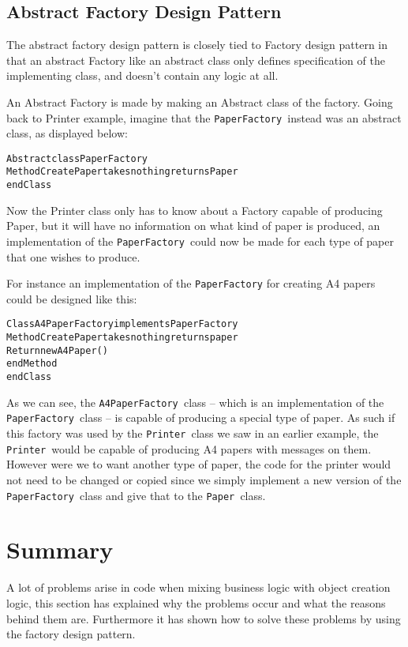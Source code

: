 \subsection{Abstract Factory Design Pattern}

The abstract factory design pattern is closely tied to Factory design
pattern in that an abstract Factory like an abstract class only defines
specification of the implementing class, and doesn\textquoteright{}t
contain any logic at all. 

An Abstract Factory is made by making an Abstract class of the factory.
Going back to Printer example, imagine that the \texttt{PaperFactory
}instead was an abstract class, as displayed below:

\begin{alltt}
Abstract class PaperFactory 	
    Method CreatePaper takes nothing returns Paper 
endClass
\end{alltt}

Now the Printer class only has to know about a Factory capable of
producing Paper, but it will have no information on what kind of paper
is produced, an implementation of the \texttt{PaperFactory }could
now be made for each type of paper that one wishes to produce.

For instance an implementation of the \texttt{PaperFactory} for creating
A4 papers could be designed like this:

\begin{alltt}
Class A4PaperFactory implements PaperFactory 	
    Method CreatePaper takes nothing returns paper 
        Return new A4Paper() 	
    endMethod 
endClass
\end{alltt}

As we can see, the \texttt{A4PaperFactory }class -- which is an implementation
of the \texttt{PaperFactory }class -- is capable of producing a special
type of paper. As such if this factory was used by the \texttt{Printer
}class we saw in an earlier example, the \texttt{Printer }would be
capable of producing A4 papers with messages on them. However were
we to want another type of paper, the code for the printer would not
need to be changed or copied since we simply implement a new version
of the \texttt{PaperFactory }class and give that to the \texttt{Paper
}class.


\section*{Summary}

A lot of problems arise in code when mixing business logic with object
creation logic, this section has explained why the problems occur
and what the reasons behind them are. Furthermore it has shown how
to solve these problems by using the factory design pattern. 

